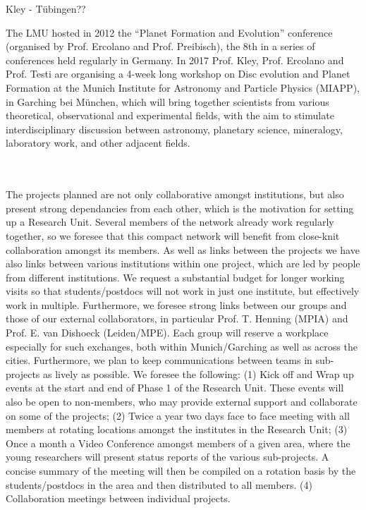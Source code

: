 \documentclass[12pt]{article}
\begin{document}
{\color{red} Kley - T\"ubingen??}

The LMU hosted in 2012 the ``Planet Formation and Evolution''
conference (organised by Prof. Ercolano and Prof. Preibisch), the 8th
in a series of conferences held regularly in Germany. In 2017
Prof. Kley, Prof. Ercolano and Prof. Testi are organising a 4-week
long workshop on Disc evolution and Planet Formation at the Munich
Institute for Astronomy and Particle Physics (MIAPP), in Garching bei
M\"unchen, which will bring
together scientists from various theoretical, observational and
experimental fields, with the aim to stimulate interdisciplinary
discussion between astronomy, planetary science, mineralogy,
laboratory work, and other adjacent fields. 

\mbox{}\vspace{1em}\\
\\
\noindent The projects planned are not only collaborative amongst institutions,
but also present strong dependancies from each other, which is the
motivation for setting up a Research Unit. Several members of the
network already work regularly together, so we foresee that this compact
network will benefit from close-knit collaboration amongst its members.
As well as links between the projects we have also links between
various institutions within one project, which are led by people from
different institutions. We request a substantial budget for longer
working visits so that students/postdocs will not work in just one
institute, but effectively work in multiple. Furthermore, we foresee
strong links between our groups and those of our external
collaborators, in particular Prof. T. Henning (MPIA) and Prof. E. van
Dishoeck (Leiden/MPE). Each group will reserve a workplace especially for such exchanges, both within Munich/Garching as well as across the cities. 
Furthermore, we plan to keep communications between teams in
sub-projects as lively as possible. We foresee the following: (1) Kick
off and Wrap up events at the start and end of Phase 1 of the Research
Unit. These events will also be open to non-members, who may provide
external support and collaborate on some of the projects; (2) Twice a
year two days face to face meeting with all members at rotating
locations amongst the institutes in the Research Unit; (3) Once a
month a Video Conference amongst members of a given area, where the young
researchers will present status reports of the various sub-projects. A
concise summary of the meeting will then be compiled on a rotation
basis by the students/postdocs in the area and then distributed to
all members. (4) Collaboration meetings between individual projects.
\end{document}

